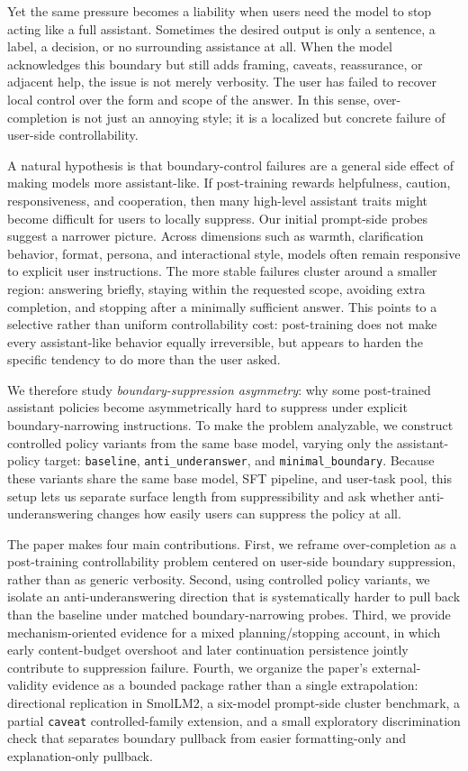 \documentclass[11pt]{article}
\begin{document}
Yet the same pressure becomes a liability when users need the model to stop acting like a full assistant. Sometimes the desired output is only a sentence, a label, a decision, or no surrounding assistance at all. When the model acknowledges this boundary but still adds framing, caveats, reassurance, or adjacent help, the issue is not merely verbosity. The user has failed to recover local control over the form and scope of the answer. In this sense, over-completion is not just an annoying style; it is a localized but concrete failure of user-side controllability.

A natural hypothesis is that boundary-control failures are a general side effect of making models more assistant-like. If post-training rewards helpfulness, caution, responsiveness, and cooperation, then many high-level assistant traits might become difficult for users to locally suppress. Our initial prompt-side probes suggest a narrower picture. Across dimensions such as warmth, clarification behavior, format, persona, and interactional style, models often remain responsive to explicit user instructions. The more stable failures cluster around a smaller region: answering briefly, staying within the requested scope, avoiding extra completion, and stopping after a minimally sufficient answer. This points to a selective rather than uniform controllability cost: post-training does not make every assistant-like behavior equally irreversible, but appears to harden the specific tendency to do more than the user asked.

We therefore study \emph{boundary-suppression asymmetry}: why some post-trained assistant policies become asymmetrically hard to suppress under explicit boundary-narrowing instructions. To make the problem analyzable, we construct controlled policy variants from the same base model, varying only the assistant-policy target: \texttt{baseline}, \texttt{anti\_underanswer}, and \texttt{minimal\_boundary}. Because these variants share the same base model, SFT pipeline, and user-task pool, this setup lets us separate surface length from suppressibility and ask whether anti-underanswering changes how easily users can suppress the policy at all.

The paper makes four main contributions. First, we reframe over-completion as a post-training controllability problem centered on user-side boundary suppression, rather than as generic verbosity. Second, using controlled policy variants, we isolate an anti-underanswering direction that is systematically harder to pull back than the baseline under matched boundary-narrowing probes. Third, we provide mechanism-oriented evidence for a mixed planning/stopping account, in which early content-budget overshoot and later continuation persistence jointly contribute to suppression failure. Fourth, we organize the paper's external-validity evidence as a bounded package rather than a single extrapolation: directional replication in SmolLM2, a six-model prompt-side cluster benchmark, a partial \texttt{caveat} controlled-family extension, and a small exploratory discrimination check that separates boundary pullback from easier formatting-only and explanation-only pullback.
\end{document}
